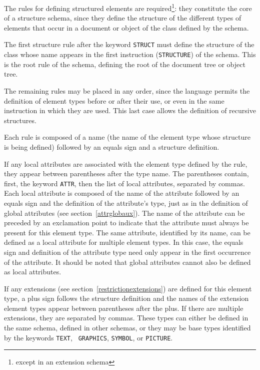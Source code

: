 The rules for defining structured elements are
required{\footnote{except in an extension schema}}: they constitute
the core of a structure schema, since they define the structure of the
different types of elements that occur in a document or object of
the class defined by the schema.

The first structure rule after the keyword {\tt STRUCT} must define
the structure of the class whose name appears in the first instruction
({\tt STRUCTURE}) of the schema.  This is the root rule of the schema,
defining the root of the document tree or object tree.

The remaining rules may be placed in any order, since the language
permits the definition of element types before or after their use, or
even in the same instruction in which they are used.  This last case
allows the definition of recursive structures.

Each rule is composed of a name (the name of the element type whose
structure is being defined) followed by an equals sign and a structure
definition.

If any local attributes are associated with the element type defined
by the rule, they appear between parentheses after the type name.  The
parentheses contain, first, the keyword {\tt ATTR}, then the list of
local attributes, separated by commas.  Each local attribute is
composed of the name of the attribute followed by an equals sign and
the definition of the attribute's type, just as in the definition of
global attributes (see section~\ref{attrglobaux}).  The name of the
attribute can be preceded by an exclamation point to indicate that the
attribute must always be present for this element type.  The same
attribute, identified by its name, can be defined  as a local
attribute for multiple element types.  In this case, the equals sign
and definition of the attribute type need only appear in the first
occurrence of the attribute.  It should be noted that global attributes
cannot also be defined as local attributes.

If any extensions (see section~\ref{restrictionextensions}) are defined for this element type, a plus sign
follows the structure definition and the names of the extension
element types appear between parentheses after the plus.  If there are
multiple extensions, they are separated by commas.  These types can
either be defined in the same schema, defined in other schemas,
or they may be base types identified by the keywords {\tt TEXT}, {\tt
GRAPHICS}, {\tt SYMBOL}, or {\tt PICTURE}.

